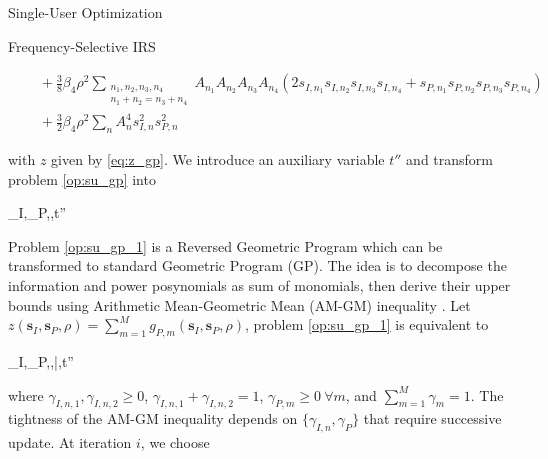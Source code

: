 \documentclass{IEEEtran}
\begin{document}
\begin{section}{Single-User Optimization}
\begin{subsection}{Frequency-Selective IRS}
\begin{figure*}[b]
\begin{equation}
\begin{split}
					&\quad+\frac{3}{8}{\beta_4}{\rho^2}\sum_{\substack{{n_1},{n_2},{n_3},{n_4}\\{n_1}+{n_2}={n_3}+{n_4}}}{A_{n_1}A_{n_2}A_{n_3}A_{n_4}(2s_{I,n_1}s_{I,n_2}s_{I,n_3}s_{I,n_4}+s_{P,n_1}s_{P,n_2}s_{P,n_3}s_{P,n_4})}\\
					&\quad+\frac{3}{2}{\beta_4}{\rho^2}\sum_n{{A_n^4}{s_{I,n}^2}{s_{P,n}^2}}
				\end{split}
			\end{equation}
		\end{figure*}
		with $z$ given by \ref{eq:z_gp}. We introduce an auxiliary variable $t''$ and transform problem \ref{op:su_gp} into
		\begin{mini!}
				{\boldsymbol{s}_I,_P,\rho,t''}{}{\label{op:su_gp_1}}{}
			\end{mini!}
		Problem \ref{op:su_gp_1} is a Reversed Geometric Program which can be transformed to standard Geometric Program (GP). The idea is to decompose the information and power posynomials as sum of monomials, then derive their upper bounds using Arithmetic Mean-Geometric Mean (AM-GM) inequality \cite{Clerckx2018b,Chiang2005}. Let $z(\boldsymbol{s}_I,\boldsymbol{s}_P,\rho)=\sum_{m=1}^{M}{g_{P,m}(\boldsymbol{s}_I,\boldsymbol{s}_P,\rho)}$, problem \ref{op:su_gp_1} is equivalent to
		\begin{mini}
			{\boldsymbol{s}_I,_P,\rho,\bar{\rho},t''}{}{\label{op:su_gp_2}}{}
		\end{mini}
		where $\gamma_{I,n,1},\gamma_{I,n,2} \ge 0$, $\gamma_{I,n,1}+\gamma_{I,n,2}=1$, $\gamma_{P,m} \ge 0 \ \forall m$, and $\sum_{m=1}^{M}{\gamma_m}=1$. The tightness of the AM-GM inequality depends on $\{\gamma_{I,n},\gamma_P\}$ that require successive update. At iteration $i$, we choose \cite{Clerckx2018b}

\end{subsection}
\end{section}
\end{document}
